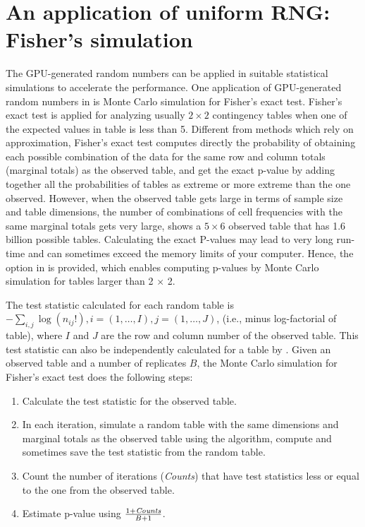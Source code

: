 \documentclass[article,nojss]{jss}\usepackage[]{graphicx}\usepackage[]{color}
\newcommand{\fct}[1]{\code{#1()}}
\begin{document}
\section{An application of uniform RNG: Fisher's simulation}
The GPU-generated random numbers can be applied in suitable statistical simulations to accelerate the performance.
One application of GPU-generated random numbers in  is Monte Carlo simulation for Fisher's exact test. Fisher’s exact test is applied for analyzing usually $2 \times 2$ contingency tables when one of the expected values in table is less than 5. Different from methods which rely on approximation, Fisher's exact test computes directly the probability of obtaining each possible combination of the data for the same row and column totals (marginal totals) as the observed table, and get the exact p-value by adding together all the probabilities of tables as extreme or more extreme than the one observed. However, when the observed table gets large in terms of sample size and table dimensions, the number of combinations of cell frequencies with the same marginal totals gets very large, \cite[][p. 23]{mehta2011ibm} shows a $5 \times 6$ observed table that has 1.6 billion possible tables. Calculating the exact P-values may lead to very long run-time and can sometimes exceed the memory limits of your computer. Hence, the option  in \fct{stats::fisher.test} is provided, which enables computing p-values by Monte Carlo simulation for tables larger than 2 $\times$ 2. 

The test statistic calculated for each random table is $-\sum_{i,j}\log(n_{ij}!), i=(1,\dots, I), j=(1,\dots,J)$, (i.e., minus log-factorial of table), where $I$ and $J$ are the row and column number of the observed table. This test statistic can also be independently calculated for a table by \fct{clrng::logfactSum}. Given an observed table and a number of replicates $B$, the Monte Carlo simulation for Fisher's exact test does the following steps: 
\begin{enumerate}
\setlength\itemsep{0em}
  \item Calculate the test statistic for the observed table.
    \item In each iteration, simulate a random table with the same dimensions and marginal totals as the observed table using the \fct{rcont2} algorithm, compute and sometimes save the test statistic from the random table. 
    \item Count the number of iterations (\emph{Counts}) that have test statistics less or equal to the one from the observed table.
    \item Estimate p-value using $\frac{1 + \emph{Counts}}{B + 1}$.
\end{enumerate}
\end{document}
